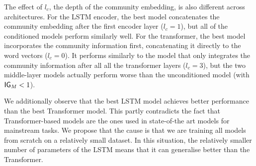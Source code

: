 \documentclass[11pt]{article}
\begin{document}
The effect of $l_c$, the depth of the community embedding,
is also different across architectures.
For the LSTM encoder, 
the best model concatenates the community embedding after the first encoder layer ($l_c=1$),
but all of the conditioned models perform similarly well.
For the transformer, the best model incorporates the community information
first, concatenating it directly to the word vectors ($l_c=0$).
It performs similarly to the model that only integrates the community information
after all all the transformer layers ($l_c=3$),
but the two middle-layer models actually perform worse than the unconditioned model
(with $\mathsf{IG}_M < 1$).

We additionally observe that the best LSTM model achieves better
performance than the best Transformer model. This partly contradicts
the fact that Transformer-based models are the ones used in
state-of-the art models for mainstream tasks. We propose that the
cause is that we are training all models from scratch on a relatively
small dataset. In this situation, the relatively smaller number of
parameters of the LSTM means that it can generalise better than the
Transformer.
\end{document}
